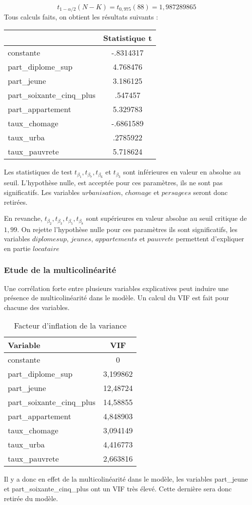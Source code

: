 \documentclass[]{article}
\begin{document}
\begin{equation*}
    t_{1-\alpha/2}(N-K) = t_{0,975}(88) = 1,987289865 
\end{equation*}
Tous calculs faits, on obtient les résultats suivants :
\begin{table}[H]
\centering
\begin{tabular}{l*{1}{c}}
\toprule
            &Statistique t\\
\midrule
constante      &   -.8314317\\
part\_diplome\_sup&    4.768476\\
part\_jeune  &    3.186125\\
part\_soixante\_cinq\_plus&     .547457\\
part\_appartement&    5.329783\\
taux\_chomage&   -.6861589\\
taux\_urba   &    .2785922\\
taux\_pauvrete&    5.718624\\
\bottomrule
\end{tabular}
\end{table}
Les statistiques de test $t_{\beta_1},t_{\beta_7},t_{\beta_6}$ et $t_{\beta_3}$ sont inférieures en valeur en absolue au seuil. L'hypothèse nulle, est
acceptée pour ces paramètres, ils ne sont pas significatifs. Les variables $urbanisation$, $chomage$ et $persagees$ seront donc retirées.

En revanche, $t_{\beta_2}, t_{\beta_3}, t_{\beta_5}, t_{\beta_8}$ sont supérieures en valeur absolue au seuil critique de $1,99$. On rejette l'hypothèse nulle pour ces paramètres
ils sont significatifs, les variables $diplomesup$, $jeunes$, $appartements$ et $pauvrete$ permettent d'expliquer en partie $locataire$
\subsubsection{Etude de la multicolinéarité}
Une corrélation forte entre plusieurs variables explicatives peut induire une présence de multicolinéarité dans le modèle. Un calcul du VIF est fait pour chacune des variables.
\begin{table}[H]
\centering
\caption{Facteur d'inflation de la variance}
\begin{tabular}{l*{1}{c}}
\toprule
Variable            &         VIF\\
\midrule
constante & 0 \\
part\_diplome\_sup&    3,199862\\
part\_jeune  &    12,48724\\
part\_soixante\_cinq\_plus&    14,58855\\
part\_appartement&    4,848903\\
taux\_chomage&    3,094149\\
taux\_urba   &    4,416773\\
taux\_pauvrete&    2,663816\\
\bottomrule
\end{tabular}
\end{table}
Il y a donc en effet de la multicolinéarité dans le modèle, les variables part\_jeune et part\_soixante\_cinq\_plus ont un VIF très élevé. Cette dernière sera donc retirée du
modèle.
\end{document}
